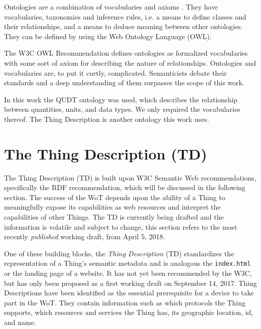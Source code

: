 Ontologies are a combination of vocabularies and axioms \cite{Cyganiak.2014}. They have vocabularies, taxonomies and inference rules, i.e. a means to define classes and their relationships, and a means to deduce meaning between other ontologies. \cite{berners2001semantic} They can be defined by using the Web Ontology Language (OWL).

The W3C OWL Recommendation defines ontologies as formalized vocabularies with some sort of axiom for describing the nature of relationships. \cite{Synak.2009}  Ontologies and vocabularies are, to put it curtly, complicated. Semanticists debate their standards and a deep understanding of them surpasses the scope of this work.

In this work the QUDT ontology was used, which describes the relationship between quantities, units, and data types. We only required the vocabularies thereof. The Thing Description is another ontology\cite{Charpenay.2016} this work uses.






\section{The Thing Description (TD)}
The Thing Description (TD) is built upon W3C Semantic Web recommendations, specifically the RDF recommendation, which will be discussed in the following section. The success of the WoT depends upon the ability of a Thing to meaningfully expose its capabilities as web resources and interpret the capabilities of other Things\cite{Charpenay.2016}. The TD is currently being drafted and the information is volatile and subject to change, this section refers to the most recently \textit{published} working draft, from April 5, 2018. 


One of these building blocks, the \textit{Thing Description} (TD) standardizes the representation of a Thing's semantic metadata and is analogous the \texttt{index.html} or the landing page of a website. It has not yet been recommended by the W3C, but has only been proposed as a first working draft on September 14, 2017. \cite{Kabisch.2017} 
Thing Descriptions have been identified as the essential prerequisite for a device to take part in the WoT\cite{Kazuo.2017}. They contain information such as which protocols the Thing supports, which resources and services the Thing has, its geographic location, id, and name. 


